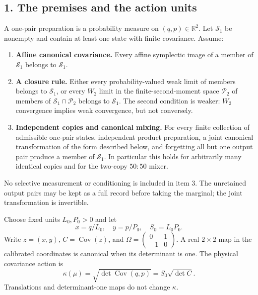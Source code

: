 \documentclass[11pt,a4paper]{article}
\newcommand{\tightlist}{\setlength{\itemsep}{0pt}\setlength{\parskip}{0pt}}
\begin{document}
\hypertarget{the-premises-and-the-action-units}{%
\subsection{1. The premises and the action
units}\label{the-premises-and-the-action-units}}

A one-pair preparation is a probability measure on
\((q,p)\in\mathbb R^2\). Let \(\mathcal S_1\) be nonempty and contain at
least one state with finite covariance. Assume:

\begin{enumerate}
\def\labelenumi{\arabic{enumi}.}
\tightlist
\item
  \textbf{Affine canonical covariance.} Every affine symplectic image of
  a member of \(\mathcal S_1\) belongs to \(\mathcal S_1\).
\item
  \textbf{A closure rule.} Either every probability-valued weak limit of
  members belongs to \(\mathcal S_1\), or every \(W_2\) limit in the
  finite-second-moment space \(\mathcal P_2\) of members of
  \(\mathcal S_1\cap\mathcal P_2\) belongs to \(\mathcal S_1\). The
  second condition is weaker: \(W_2\) convergence implies weak
  convergence, but not conversely.
\item
  \textbf{Independent copies and canonical mixing.} For every finite
  collection of admissible one-pair states, independent product
  preparation, a joint canonical transformation of the form described
  below, and forgetting all but one output pair produce a member of
  \(\mathcal S_1\). In particular this holds for arbitrarily many
  identical copies and for the two-copy \(50{:}50\) mixer.
\end{enumerate}

No selective measurement or conditioning is included in item 3. The
unretained output pairs may be kept as a full record before taking the
marginal; the joint transformation is invertible.

Choose fixed units \(L_0,P_0>0\) and let
\[x=q/L_0,\quad y=p/P_0,\quad S_0=L_0P_0.\tag{2}\] Write \(z=(x,y)\),
\(C=\operatorname{Cov}(z)\), and
\(\Omega=\begin{pmatrix}0&1\\-1&0\end{pmatrix}\). A real \(2\times2\)
map in the calibrated coordinates is canonical when its determinant is
one. The physical covariance action is
\[\kappa(\mu)=\sqrt{\det\operatorname{Cov}(q,p)}
             =S_0\sqrt{\det C}.\tag{3}\] Translations and
determinant-one maps do not change \(\kappa\).
\end{document}

